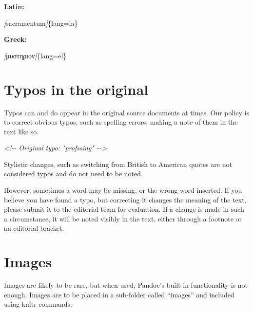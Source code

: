 \documentclass[
]{book}
\newenvironment{Shaded}{\begin{snugshade}}{\end{snugshade}}
\newcommand{\CommentTok}[1]{\textcolor[rgb]{0.56,0.35,0.01}{\textit{#1}}}
\newcommand{\NormalTok}[1]{#1}
\newcommand{\OtherTok}[1]{\textcolor[rgb]{0.56,0.35,0.01}{#1}}
\begin{document}
\textbf{Latin:}

\begin{Shaded}
\begin{Highlighting}[]
\CommentTok{[}\OtherTok{sacramentum}\CommentTok{]}\NormalTok{\{lang=la\}}
\end{Highlighting}
\end{Shaded}

\textbf{Greek:}

\begin{Shaded}
\begin{Highlighting}[]
\CommentTok{[}\OtherTok{μυστηριον}\CommentTok{]}\NormalTok{\{lang=el\}}
\end{Highlighting}
\end{Shaded}

\hypertarget{typos-in-the-original}{%
\chapter{Typos in the original}\label{typos-in-the-original}}

Typos can and do appear in the original source documents at times. Our policy is to correct obvious typos, such as spelling errors, making a note of them in the text like so.

\begin{Shaded}
\begin{Highlighting}[]
\CommentTok{\textless{}!{-}{-} Original typo: "profssing" {-}{-}\textgreater{}}
\end{Highlighting}
\end{Shaded}

Stylistic changes, such as switching from British to American quotes are not considered typos and do not need to be noted.

However, sometimes a word may be missing, or the wrong word inserted. If you believe you have found a typo, but correcting it changes the meaning of the text, please submit it to the editorial team for evaluation. If a change is made in such a circumstance, it will be noted visibly in the text, either through a footnote or an editorial bracket.

\hypertarget{images}{%
\chapter{Images}\label{images}}

Images are likely to be rare, but when used, Pandoc's built-in functionality is not enough. Images are to be placed in a sub-folder called ``images'' and included using knitr commands:
\end{document}
